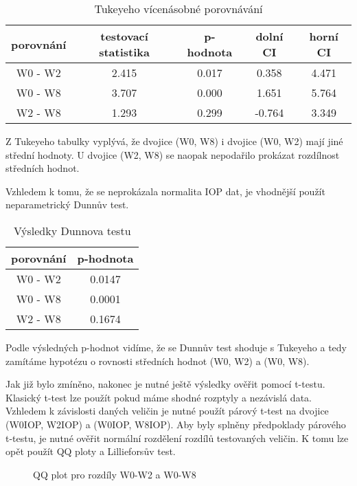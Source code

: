 \documentclass{article}
\begin{document}
\begin{table}[H]
  \small
  \centering 
  \caption{Tukeyeho vícenásobné porovnávání}
  \begin{tabular}{|ccccc|}
    \hline
    porovnání & testovací statistika & p-hodnota & dolní CI & horní CI\\
    \hline
    W0 - W2 & 2.415 & 0.017 & 0.358 & 4.471\\
    W0 - W8 & 3.707 & 0.000 & 1.651 & 5.764\\
    W2 - W8 & 1.293   & 0.299  &  -0.764  &   3.349\\
    \hline
  \end{tabular}
\end{table}

Z Tukeyeho tabulky vyplývá, že dvojice (W0, W8) i dvojice (W0, W2) mají jiné střední hodnoty.
U dvojice (W2, W8) se naopak nepodařilo prokázat rozdílnost středních hodnot.

Vzhledem k tomu, že se neprokázala normalita IOP dat, je vhodnější použít neparametrický Dunnův test.

\begin{table}[H]
  \small
  \centering 
  \caption{Výsledky Dunnova testu}
  \begin{tabular}{|cc|}
    \hline
    porovnání & p-hodnota\\
    \hline
    W0 - W2 & 0.0147\\
    W0 - W8 & 0.0001\\
    W2 - W8 & 0.1674\\
    \hline
  \end{tabular}
\end{table}

Podle výsledných p-hodnot vidíme, že se Dunnův test shoduje s Tukeyeho a tedy zamítáme hypotézu o rovnosti středních hodnot (W0, W2) a (W0, W8).

Jak již bylo zmíněno, nakonec je nutné ještě výsledky ověřit pomocí t-testu.
Klasický t-test lze použít pokud máme shodné rozptyly a nezávislá data.
Vzhledem k závislosti daných veličin je nutné použít párový t-test na  dvojice (W0IOP, W2IOP) a (W0IOP, W8IOP).
Aby byly splněny předpoklady párového t-testu, je nutné ověřit normální rozdělení rozdílů testovaných veličin. K tomu lze opět použít QQ ploty a Lillieforsův test.


\begin{figure}[H]
  \centering
    
    \caption{QQ plot pro rozdíly W0-W2 a W0-W8}
\end{figure}
\end{document}
